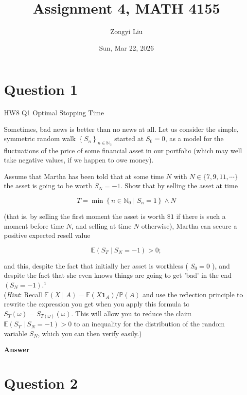 \documentclass[letterpaper]{article}
\title{Assignment 4, MATH 4155}
\author{Zongyi Liu}
\date{Sun, Mar 22, 2026}
\begin{document}
		\maketitle
		
		\section{Question 1}
		
		{\color{deepred} HW8 Q1 Optimal Stopping Time}
		
		Sometimes, bad news is better than no news at all. Let us consider the simple, symmetric random walk $\left\{S_{n}\right\}_{n \in \mathbb{N}_{0}}$ started at $S_{0}=0$, as a model for the fluctuations of the price of some financial asset in our portfolio (which may well take negative values, if we happen to owe money).
		
		Assume that Martha has been told that at some time $N$ with $N \in\{7,9,11, \cdots\}$ the asset is going to be worth $S_{N}=-1$. Show that by selling the asset at time
		
		$$
		T=\min \left\{n \in \mathbb{N}_{0} \mid S_{n}=1\right\} \wedge N
		$$
		
		(that is, by selling the first moment the asset is worth $\$ 1$ if there is such a moment before time $N$, and selling at time $N$ otherwise), Martha can secure a positive expected resell value
		
		$$
		\mathbb{E}\left(S_{T} \mid S_{N}=-1\right)>0 ;
		$$
		
		and this, despite the fact that initially her asset is worthless ( $S_{0}=0$ ), and despite the fact that she even knows things are going to get 'bad' in the end $\left(S_{N}=-1\right) .^{1}$\\
		(\emph{Hint}: Recall $\mathbb{E}(X \mid A)=\mathbb{E}\left(X \mathbf{1}_{A}\right) / \mathbb{P}(A)$ and use the reflection principle to rewrite the expression you get when you apply this formula to $S_{T}(\omega)=S_{T(\omega)}(\omega)$. This will allow you to reduce the claim $\mathbb{E}\left(S_{T} \mid S_{N}=-1\right)>0$ to an inequality for the distribution of the random variable $S_{N}$, which you can then verify easily.)
		
		
		\textbf{Answer}
		
		\clearpage
		
		\section{Question 2}
		
\end{document}
